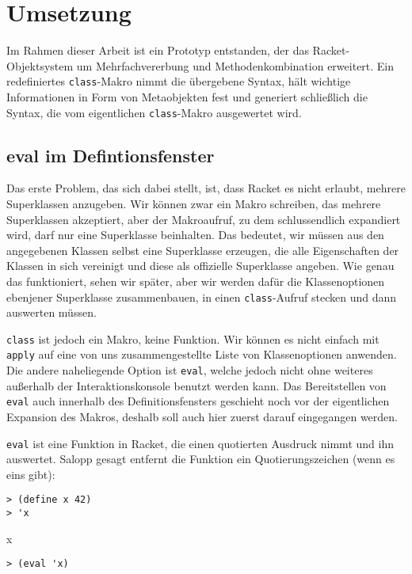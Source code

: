 \chapter{Umsetzung}  
\label{implementation}

\vspace{-1em}
Im Rahmen dieser Arbeit ist ein Prototyp entstanden, der das Racket-Objektsystem um Mehrfachvererbung und Methodenkombination erweitert. Ein redefiniertes \texttt{class}-Makro nimmt die übergebene Syntax, hält wichtige Informationen in Form von Metaobjekten fest und generiert schließlich die Syntax, die vom eigentlichen \texttt{class}-Makro ausgewertet wird.

\section{eval im Defintionsfenster}

Das erste Problem, das sich dabei stellt, ist, dass Racket es nicht erlaubt, mehrere Superklassen anzugeben. Wir können zwar ein Makro schreiben, das mehrere Superklassen akzeptiert, aber der Makroaufruf, zu dem schlussendlich expandiert wird, darf nur eine Superklasse beinhalten. Das bedeutet, wir müssen aus den angegebenen Klassen selbst eine Superklasse erzeugen, die alle Eigenschaften der Klassen in sich vereinigt und diese als offizielle Superklasse angeben. Wie genau das funktioniert, sehen wir später, aber wir werden dafür die Klassenoptionen ebenjener Superklasse zusammenbauen, in einen \texttt{class}-Aufruf stecken und dann auswerten müssen.

\texttt{class} ist jedoch ein Makro, keine Funktion. Wir können es nicht einfach mit \texttt{apply} auf eine von uns zusammengestellte Liste von Klassenoptionen anwenden. Die andere naheliegende Option ist \texttt{eval}, welche jedoch nicht ohne weiteres außerhalb der Interaktionskonsole benutzt werden kann. Das Bereitstellen von \texttt{eval} auch innerhalb des Definitionsfensters geschieht noch vor der eigentlichen Expansion des Makros, deshalb soll auch hier zuerst darauf eingegangen werden.

\texttt{eval} ist eine Funktion in Racket, die einen quotierten Ausdruck nimmt und ihn auswertet. Salopp gesagt entfernt die Funktion ein Quotierungszeichen (wenn es eins gibt):

\begin{lstlisting}
> (define x 42)
> 'x
\end{lstlisting}
{\rsymbol x}
\vspace{-1em}
\begin{lstlisting}
> (eval 'x)
\end{lstlisting}
{}

